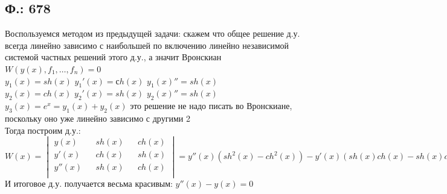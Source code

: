 \documentclass{article}
\begin{document}
\subsection{Ф.: 678}
Воспользуемся методом из предыдущей задачи: скажем что общее решение д.у. всегда линейно зависимо с наибольшей по включению линейно независимой системой частных решений этого д.у., а значит Вронскиан $W(y(x),f_1,\ldots, f_n)=0$\\
$y_1(x)=sh(x)$ $y_1'(x)=сh(x)$ $y_1(x)''=sh(x)$ \\
$y_2(x)=ch(x)$ $y_2'(x)=sh(x)$ $y_2(x)''=sh(x)$ \\
$y_3(x)=e^x=y_1(x)+y_2(x)$ это решение не надо писать во Вронскиане, поскольку оно уже линейно зависимо с другими 2\\
Тогда построим д.у.:
\begin{equation}
    W(x)
    =
    \begin{vmatrix}
     y(x) && sh(x) && ch(x)\\
     y'(x) && ch(x) && sh(x)\\
     y''(x) && sh(x) && ch(x)\\
    \end{vmatrix}
    =y''(x) (sh^2(x)-ch^2(x)) - y'(x) (sh(x)ch(x)-sh(x)ch(x)) + y(x) (ch^2(x)-sh^2(x))
    =0
\end{equation}
И итоговое д.у. получается весьма красивым: $y''(x)-y(x)=0$
\end{document}
